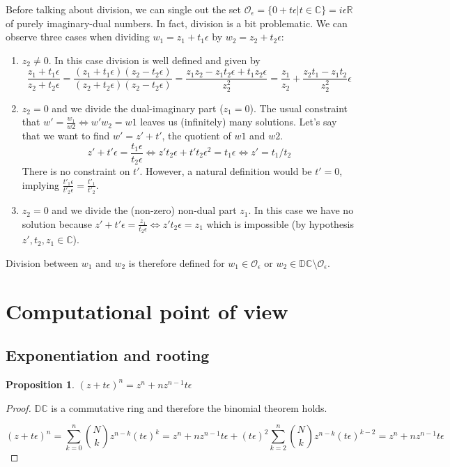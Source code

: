\documentclass{article}
\newtheorem{proposition}[theorem]{Proposition}
\newcommand{\R}{\mathbb{R}}
\newcommand{\C}{\mathbb{C}}
\newcommand{\DC}{\mathbb{DC}}
\newcommand{\Z}{\mathcal{O}_\e}
\newcommand{\e}{\epsilon}
\begin{document}
Before talking about division, we can single out the set $\Z = \{0 + t \e | t \in \C\} = i\e \R$ of purely imaginary-dual numbers. In fact, division is a bit problematic. We can observe three cases when dividing $w_1 = z_1 + t_1 \e$ by $w_2 = z_2 + t_2 \e$:

\begin{enumerate}
        \item $z_2 \neq 0$. In this case division is well defined and given by
        \begin{equation}
        \frac{z_1 + t_1 \e}{z_2 + t_2 \e} = \frac{(z_1 + t_1 \e)(z_2 - t_2 \e)}{(z_2 + t_2 \e)(z_2 - t_2 \e)} = \frac{z_1 z_2 - z_1 t_2 \e + t_1 z_2 \e}{z_2^2} = \frac{z_1}{z_2} + \frac{z_2 t_1 - z_1 t_2 }{z_2^2} \e
        \end{equation}
        \item $z_2 = 0$ and we divide the dual-imaginary part ($z_1 = 0$). The usual constraint that $w' = \frac{w_1}{w2} \iff w'w_2 = w1$ leaves us (infinitely) many solutions. Let's say that we want to find $w' = z' + t'$, the quotient of $w1$ and $w2$.
        \begin{equation}
        z' + t' \e = \frac{t_1 \e}{t_2 \e} \iff z' t_2 \e + t' t_2 \e^2 = t_1 \e \iff z' = t_1/t_2
        \end{equation}
        There is no constraint on $t'$. However, a natural definition would be $t' = 0$, implying $\frac{t'_1 \e}{t'_2 \e} = \frac{t'_1}{t'_2}$.
        \item $z_2 = 0$ and we divide the (non-zero) non-dual part $z_1$. In this case we have no solution because $z' + t'\e = \frac{z_1}{t_2 \e} \iff z' t_2 \e = z_1$ which is impossible (by hypothesis $z', t_2, z_1 \in \C$).
\end{enumerate}

Division between $w_1$ and $w_2$ is therefore defined for $w_1 \in \Z$ or $w_2 \in \DC \setminus \Z$.

\section{Computational point of view}
\subsection{Exponentiation and rooting}

\begin{proposition}
$(z + t\e)^n = z^n + n z^{n-1} t \e$
\end{proposition}
\begin{proof}
$\DC$ is a commutative ring and therefore the binomial theorem holds.

\noindent \begin{equation}
(z + t\e)^n = \sum_{k=0}^n \binom{N}{k} z^{n-k}(t\e)^k = z^n + nz^{n-1}t\e + (t\e)^2 \sum_{k=2}^n \binom{N}{k} z^{n-k}(t\e)^{k-2} = z^n + nz^{n-1}t\e
\end{equation}
\end{proof}
\end{document}
